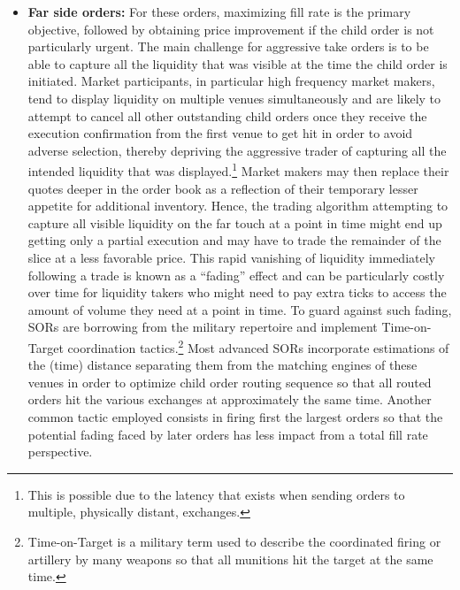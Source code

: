 \begin{itemize}
\item \textbf{Far side orders:} For these orders, maximizing fill rate is the primary objective, followed by obtaining price improvement if the child order is not particularly urgent. The main challenge for aggressive take orders is to be able to capture all the liquidity that was visible at the time the child order is initiated. Market participants, in particular high frequency market makers, tend to display liquidity on multiple venues simultaneously and are likely to attempt to cancel all other outstanding child orders once they receive the execution confirmation from the first venue to get hit in order to avoid adverse selection, thereby depriving the aggressive trader of capturing all the intended liquidity that was displayed.\footnote{This is possible due to the latency that exists when sending orders to multiple, physically distant, exchanges.} Market makers may then replace their quotes deeper in the order book as a reflection of their temporary lesser appetite for additional inventory. Hence, the trading algorithm attempting to capture all visible liquidity on the far touch at a point in time might end up getting only a partial execution and may have to trade the remainder of the slice at a less favorable price. This rapid vanishing of liquidity immediately following a trade is known as a ``fading'' effect and can be particularly costly over time for liquidity takers who might need to pay extra ticks to access the amount of volume they need at a point in time. To guard against such fading, SORs are borrowing from the military repertoire and implement Time-on-Target coordination tactics.\footnote{Time-on-Target is a military term used to describe the coordinated firing or artillery by many weapons so that all munitions hit the target at the same time.} Most advanced SORs incorporate estimations of the (time) distance separating them from the matching engines of these venues in order to optimize child order routing sequence so that all routed orders hit the various exchanges at approximately the same time. Another common tactic employed consists in firing first the largest orders so that the potential fading faced by later orders has less impact from a total fill rate perspective. 


\end{itemize}
